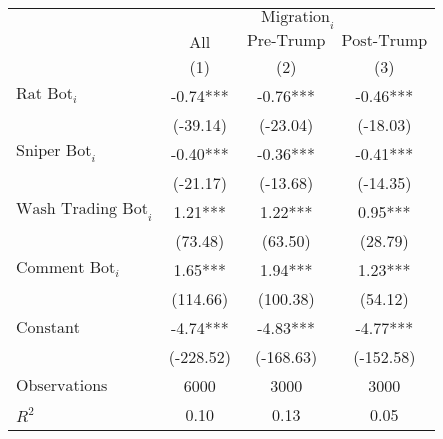 \begin{tabular}{lccc}
\toprule
 & \multicolumn{3}{c}{$\text{Migration}_{i}$} \\
\cline{2-4}
 & $\text{All}$ & $\text{Pre-Trump}$ & $\text{Post-Trump}$\\
 & (1) & (2) & (3)\\
\midrule
$\text{Rat Bot}_{i}$ & -0.74*** & -0.76*** & -0.46*** \\
 & (-39.14) & (-23.04) & (-18.03) \\
$\text{Sniper Bot}_{i}$ & -0.40*** & -0.36*** & -0.41*** \\
 & (-21.17) & (-13.68) & (-14.35) \\
$\text{Wash Trading Bot}_{i}$ & 1.21*** & 1.22*** & 0.95*** \\
 & (73.48) & (63.50) & (28.79) \\
$\text{Comment Bot}_{i}$ & 1.65*** & 1.94*** & 1.23*** \\
 & (114.66) & (100.38) & (54.12) \\
$\text{Constant}$ & -4.74*** & -4.83*** & -4.77*** \\
 & (-228.52) & (-168.63) & (-152.58) \\
\midrule
$\text{Observations}$ & 6000 & 3000 & 3000 \\
$R^2$ & 0.10 & 0.13 & 0.05 \\
\bottomrule
\end{tabular}